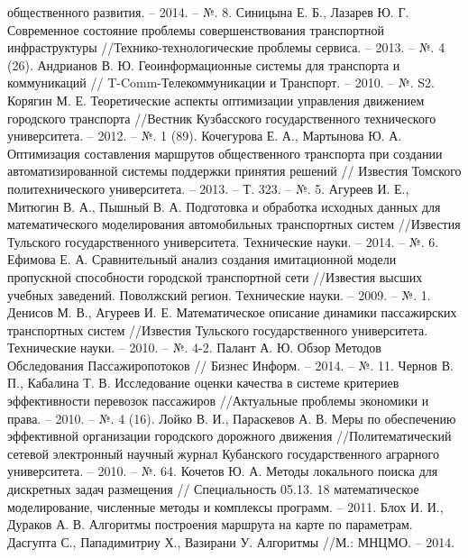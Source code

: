 \begin{thebibliography}{10}
        общественного развития. -- 2014. -- №. 8.
     Синицына Е. Б., Лазарев Ю. Г. Современное состояние проблемы совершенствования 
        транспортной инфраструктуры //Технико-технологические проблемы сервиса. -- 2013. -- №. 4 (26).
     Андрианов В. Ю. Геоинформационные системы для транспорта и коммуникаций //
        T-Comm-Телекоммуникации и Транспорт. -- 2010. -- №. S2.
     Корягин М. Е. Теоретические аспекты оптимизации управления движением городского 
        транспорта //Вестник Кузбасского государственного технического университета. -- 2012. -- №. 1 (89).
     Кочегурова Е. А., Мартынова Ю. А. Оптимизация составления маршрутов общественного 
        транспорта при создании автоматизированной системы поддержки принятия решений //
        Известия Томского политехнического университета. -- 2013. -- Т. 323. -- №. 5.
     Агуреев И. Е., Митюгин В. А., Пышный В. А. Подготовка и обработка исходных данных 
        для математического моделирования автомобильных транспортных систем //Известия Тульского 
        государственного университета. Технические науки. -- 2014. -- №. 6.
     Ефимова Е. А. Сравнительный анализ создания имитационной модели пропускной 
        способности городской транспортной сети //Известия высших учебных заведений. Поволжский регион. 
        Технические науки. -- 2009. -- №. 1.
     Денисов М. В., Агуреев И. Е. Математическое описание динамики пассажирских 
        транспортных систем //Известия Тульского государственного университета. 
        Технические науки. -- 2010. -- №. 4-2.
     Палант А. Ю. Обзор Методов Обследования Пассажиропотоков //
        Бизнес Информ. -- 2014. -- №. 11.
     Чернов В. П., Кабалина Т. В. Исследование оценки качества в системе критериев 
        эффективности перевозок пассажиров //Актуальные проблемы экономики и права. -- 2010. -- №. 4 (16).
     Лойко В. И., Параскевов А. В. Меры по обеспечению эффективной организации городского 
        дорожного движения //Политематический сетевой электронный научный журнал Кубанского 
        государственного аграрного университета. -- 2010. -- №. 64.
     Кочетов Ю. А. Методы локального поиска для дискретных задач размещения //
        Специальность 05.13. 18 математическое моделирование, численные методы и 
        комплексы программ. -- 2011.
     Блох И. И., Дураков А. В. Алгоритмы построения маршрута на карте по параметрам.
     Дасгупта С., Пападимитриу Х., Вазирани У. Алгоритмы //М.: МНЦМО. -- 2014.

\end{thebibliography}
